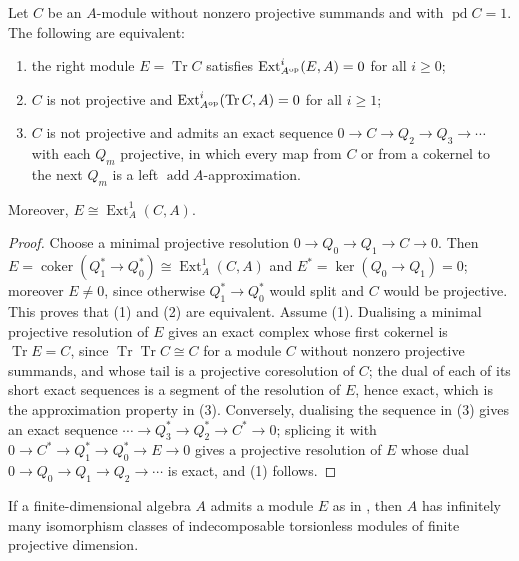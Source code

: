 \begin{proposition}
  \label{prop:infinitely-torsionfree}
  Let $C$ be an $A$-module without nonzero projective summands and with
  ${\operatorname{pd}C=1}$. The following are equivalent:
  \begin{enumerate}
    \item the right module ${E=\operatorname{Tr}C}$ satisfies
      ${\operatorname{Ext}^i_{A^{\mathrm{op}}}(E,A)=0}$ for all ${i\geq0}$;
    \item $C$ is not projective and
      ${\operatorname{Ext}^i_{A^{\mathrm{op}}}(\operatorname{Tr}C,A)=0}$ for all ${i\geq1}$;
    \item $C$ is not projective and admits an exact sequence
      ${0\to C\to Q_2\to Q_3\to\cdots}$ with each $Q_m$ projective, in which every
      map from $C$ or from a cokernel to the next $Q_m$ is a left
      $\operatorname{add}A$-approximation.
  \end{enumerate}
  Moreover, ${E\cong\operatorname{Ext}^1_A(C,A)}$.
\end{proposition}

\begin{proof}
  Choose a minimal projective resolution ${0\to Q_0\to Q_1\to C\to0}$. Then
  ${E=\operatorname{coker}(Q_1^*\to Q_0^*)\cong\operatorname{Ext}^1_A(C,A)}$ and
  ${E^*=\ker(Q_0\to Q_1)=0}$; moreover ${E\neq0}$, since otherwise ${Q_1^*\to Q_0^*}$
  would split and $C$ would be projective. This proves that (1) and (2) are
  equivalent. Assume (1). Dualising a minimal projective resolution of $E$ gives
  an exact complex whose first cokernel is ${\operatorname{Tr}E=C}$, since
  ${\operatorname{Tr}\operatorname{Tr}C\cong C}$ for a module $C$ without nonzero
  projective summands, and whose tail
  is a projective coresolution of $C$; the dual of each of its short exact
  sequences is a segment of the resolution of $E$, hence exact, which is the
  approximation property in (3). Conversely, dualising the sequence in (3) gives
  an exact sequence ${\cdots\to Q_3^*\to Q_2^*\to C^*\to0}$; splicing it with
  ${0\to C^*\to Q_1^*\to Q_0^*\to E\to0}$ gives a projective resolution of $E$
  whose dual ${0\to Q_0\to Q_1\to Q_2\to\cdots}$ is exact, and (1) follows.
\end{proof}

\begin{corollary}
  \label{coro:infinitely-many-torsionless}
  If a finite-dimensional algebra $A$ admits a module $E$ as in
  , then $A$ has infinitely many isomorphism classes
  of indecomposable torsionless modules of finite projective dimension.
\end{corollary}

